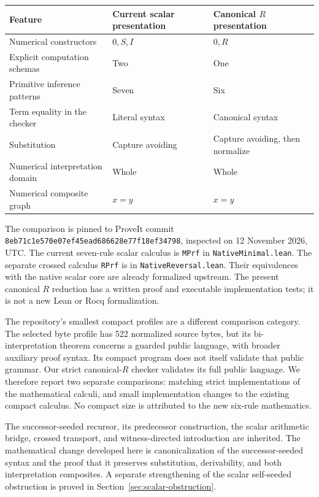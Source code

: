 \documentclass[11pt]{article}
\theoremstyle{definition}
\begin{document}
\begin{center}
\small
\begin{tabular}{lll}
\toprule
Feature & Current scalar presentation & Canonical $R$ presentation\\
\midrule
Numerical constructors & $0,S,I$ & $0,R$\\
Explicit computation schemas & Two & One\\
Primitive inference patterns & Seven & Six\\
Term equality in the checker & Literal syntax & Canonical syntax\\
Substitution & Capture avoiding & Capture avoiding, then normalize\\
Numerical interpretation domain & Whole & Whole\\
Numerical composite graph & $x=y$ & $x=y$\\
\bottomrule
\end{tabular}
\end{center}

The comparison is pinned to ProveIt commit
\texttt{8eb71c1e570e07ef45ead686628e77f18ef34798}, inspected on
12 November 2026, UTC. The current seven-rule scalar calculus is
\texttt{MPrf} in \texttt{NativeMinimal.lean}. The separate crossed calculus
\texttt{RPrf} is in \texttt{NativeReversal.lean}. Their equivalences with the
native scalar core are already formalized upstream. The present canonical
$R$ reduction has a written proof and executable implementation tests; it is
not a new Lean or Rocq formalization.

The repository's smallest compact profiles are a different comparison
category. The selected byte profile has 522 normalized source bytes, but its
bi-interpretation theorem concerns a guarded public language, with broader
auxiliary proof syntax. Its compact program does not itself validate that
public grammar. Our strict canonical-$R$ checker validates its full public
language. We therefore report two separate comparisons: matching strict
implementations of the mathematical calculi, and small implementation
changes to the existing compact calculus. No compact size is attributed to
the new six-rule mathematics.

The successor-seeded recursor, its predecessor construction, the scalar
arithmetic bridge, crossed transport, and witness-directed introduction are
inherited. The mathematical change developed here is canonicalization of the
successor-seeded syntax and the proof that it preserves substitution,
derivability, and both interpretation composites. A separate strengthening
of the scalar self-seeded obstruction is proved in
Section~\ref{sec:scalar-obstruction}.
\end{document}
